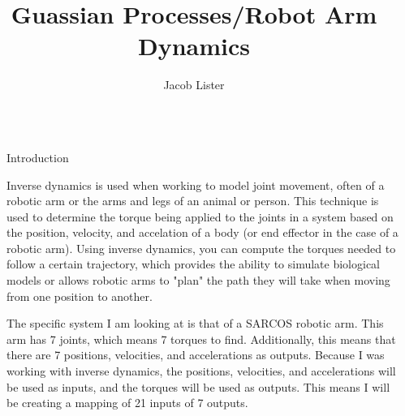 \documentclass[final]{beamer}
\title{Guassian Processes/Robot Arm Dynamics} %
\author{Jacob Lister} %
\institute{Department of Electrical and Computer Engineering\\Department of Mathematical Sciences\\Purdue Fort Wayne} %
\newlength{\sepwid}
\newlength{\onecolwid}
\begin{document}

\setlength{\belowcaptionskip}{2ex} %
\setlength\belowdisplayshortskip{2ex} %

\begin{frame}[t] %

\begin{columns}[t] %

\begin{column}{\sepwid}\end{column} %

\begin{column}{\onecolwid} %


\begin{block}{Introduction}

    Inverse dynamics is used when working to model joint movement, often of a robotic arm or
    the arms and legs of an animal or person. This technique is used to determine the torque
    being applied to the joints in a system based on the position, velocity, and accelation of
    a body (or end effector in the case of a robotic arm). Using inverse dynamics, you can
    compute the torques needed to follow a certain trajectory, which provides the ability to
    simulate biological models or allows robotic arms to "plan" the path they will take when
    moving from one position to another.

    The specific system I am looking at is that of a SARCOS robotic arm. This arm has 7 joints,
    which means 7 torques to find. Additionally, this means that there are 7 positions, velocities,
    and accelerations as outputs. Because I was working with inverse dynamics, the positions,
    velocities, and accelerations will be used as inputs, and the torques will be used as outputs.
    This means I will be creating a mapping of 21 inputs of 7 outputs.


\end{block}
\end{column}
\end{columns}
\end{frame}
\end{document}
